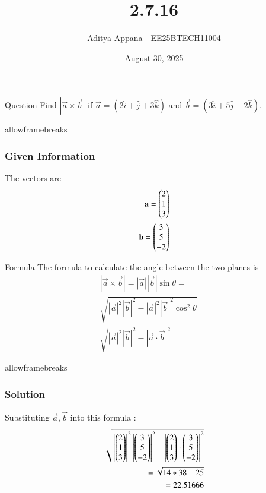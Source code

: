\documentclass{beamer}
\title %
{2.7.16}
\date{August 30, 2025}
\author %
{Aditya Appana - EE25BTECH11004}
\begin{document}
\frame{\titlepage}
\begin{frame}{Question}
Find $|\vec{a}\times \vec{b}|$ if $\vec{a} = (2\hat{i} +\hat{j} +3\hat{k})$ and  $ \vec{b}=(3\hat{i} + 5\hat{j} - 2\hat{k})$.
\end{frame}
\begin{frame}{allowframebreaks}
\frametitle{Given Information}

    \centering
    
    \label{tab:parameters}
    The vectors are
\begin{align} 
\mathbf{a} = \begin{pmatrix}2\\1\\3\end{pmatrix}\\
\mathbf{b} = \begin{pmatrix}3\\5\\-2\end{pmatrix}
\end{align}
\end{frame}


\begin{frame}{Formula}
The formula to calculate the angle between the two planes is
\begin{align}
|\vec{a}\times \vec{b}| = |\vec{a}||\vec{b}|\sin\theta = \\
\sqrt{|\vec{a}|^2|\vec{b}|^2 - |\vec{a}|^2|\vec{b}|^2\cos^2\theta} = \\
\sqrt{|\vec{a}|^2|\vec{b}|^2 - |\vec{a}\cdot \vec{b}|^2}
\end{align}



\end{frame}

\begin{frame}{allowframebreaks}
\frametitle{Solution}
Substituting $\vec{a},\vec{ b}$ into this formula :
\begin{align}
\sqrt{\left|\begin{pmatrix}2\\1\\3\end{pmatrix}\right|^2\left|\begin{pmatrix}3\\5\\-2\end{pmatrix}\right|^2 - \left|\begin{pmatrix}2\\1\\3\end{pmatrix}\cdot \begin{pmatrix}3\\5\\-2\end{pmatrix}\right|^2} \\
=\sqrt{14*38- 25}{} \\
=22.51666
\end{align}
\end{frame}
\end{document}
